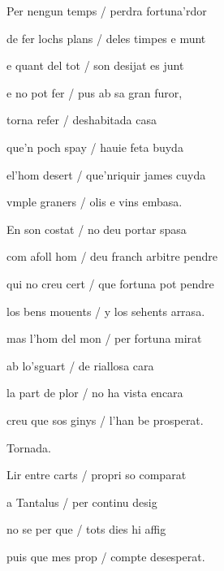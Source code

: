 \documentclass[12pt]{article}
\begin{document}
\begin{estrofa}

 Per nengun temps / perdra fortuna'rdor

 de fer lochs plans / deles timpes e munt

 e quant del tot / son desijat es junt

 e no pot fer / pus ab sa gran furor,

 torna refer / deshabitada casa

 que'n poch spay / hauie feta buyda

 el'hom desert / que'nriquir james cuyda

 vmple graners / olis e vins embasa.

\end{estrofa}



\begin{estrofa}

 En son costat / no deu portar spasa

 com afoll hom / deu franch arbitre pendre

 qui no creu cert / que fortuna pot pendre

 los bens mouents / y los sehents arrasa.

 mas l'hom del mon / per fortuna mirat

 ab lo'sguart / de riallosa cara

 la part de plor / no ha vista encara

 creu que sos ginys / l'han be prosperat.

\end{estrofa}


\begin{estrofaExtra}%




\begin{tornada}

Tornada.

\end{tornada}


\end{estrofaExtra}


\begin{estrofa}

 Lir entre carts / propri so comparat

 a Tantalus / per continu desig

 no se per que / tots dies hi affig

 puis que mes prop / compte desesperat.

\end{estrofa}
\end{document}
